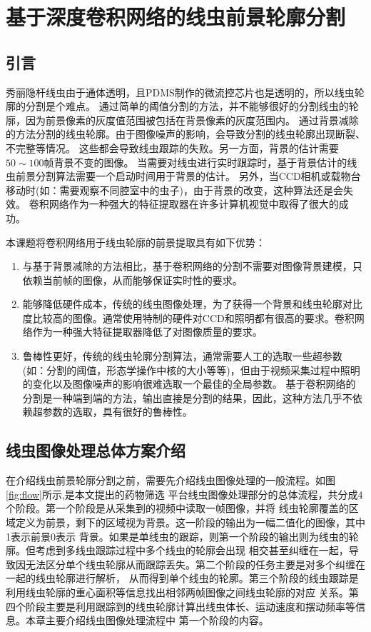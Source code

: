 \chapter{基于深度卷积网络的线虫前景轮廓分割}
\section{引言}
秀丽隐杆线虫由于通体透明，且PDMS制作的微流控芯片也是透明的，所以线虫轮廓的分割是个难点。
通过简单的阈值分割的方法，并不能够很好的分割线虫的轮廓，因为前景像素的灰度值范围被包括在背景像素的灰度范围内。
通过背景减除的方法分割的线虫轮廓。由于图像噪声的影响，会导致分割的线虫轮廓出现断裂、不完整等情况。
这些都会导致线虫跟踪的失败。另一方面，背景的估计需要$50\sim100$帧背景不变的图像。
当需要对线虫进行实时跟踪时，基于背景估计的线虫前景分割算法需要一个启动时间用于背景的估计。
另外，当CCD相机或载物台移动时(如：需要观察不同腔室中的虫子)，由于背景的改变，这种算法还是会失效。
卷积网络作为一种强大的特征提取器在许多计算机视觉中取得了很大的成功。

	本课题将卷积网络用于线虫轮廓的前景提取具有如下优势：
	
\begin{enumerate}
  \item 与基于背景减除的方法相比，基于卷积网络的分割不需要对图像背景建模，只依赖当前帧的图像，从而能够保证实时性的要求。
  \item 能够降低硬件成本，传统的线虫图像处理，为了获得一个背景和线虫轮廓对比度比较高的图像。通常使用特制的硬件对CCD和照明都有很高的要求。卷积网络作为一种强大特征提取器降低了对图像质量的要求。
  \item 鲁棒性更好，传统的线虫轮廓分割算法，通常需要人工的选取一些超参数(如：分割的阈值，形态学操作中核的大小等等)，但由于视频采集过程中照明的变化以及图像噪声的影响很难选取一个最佳的全局参数。
基于卷积网络的分割是一种端到端的方法，输出直接是分割的结果，因此，这种方法几乎不依赖超参数的选取，具有很好的鲁棒性。
\end{enumerate}

\section{线虫图像处理总体方案介绍}
	在介绍线虫前景轮廓分割之前，需要先介绍线虫图像处理的一般流程。如图\ref{fig:flow}所示,是本文提出的药物筛选
	平台线虫图像处理部分的总体流程，共分成4个阶段。第一个阶段是从采集到的视频中读取一帧图像，并将
	线虫轮廓覆盖的区域定义为前景，剩下的区域视为背景。这一阶段的输出为一幅二值化的图像，其中1表示前景0表示
	背景。如果是单线虫的跟踪，则第一个阶段的输出则为线虫的轮廓。但考虑到多线虫跟踪过程中多个线虫的轮廓会出现
	相交甚至纠缠在一起，导致因无法区分单个线虫轮廓从而跟踪丢失。第二个阶段的任务主要是对多个纠缠在一起的线虫轮廓进行解析，
	从而得到单个线虫的轮廓。第三个阶段的线虫跟踪是利用线虫轮廓的重心面积等信息找出相邻两帧图像之间线虫轮廓的对应
	关系。第四个阶段主要是利用跟踪到的线虫轮廓计算出线虫体长、运动速度和摆动频率等信息。本章主要介绍线虫图像处理流程中
	第一个阶段的内容。


